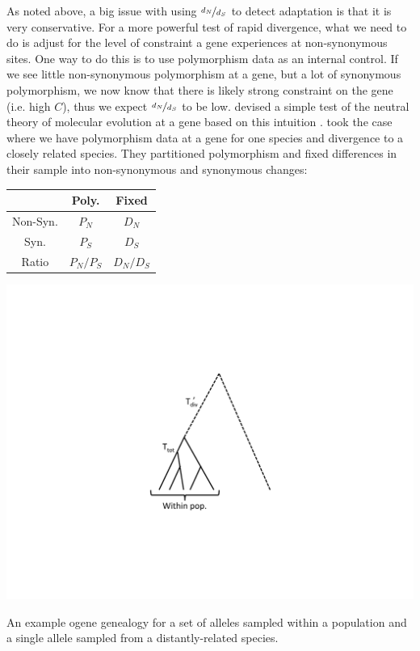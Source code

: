As noted above, a big issue with using $\nicefrac{d_N}{d_S}$ to detect adaptation is that it is very conservative. For a more powerful test of rapid divergence, what we need to do is adjust for the level of constraint a gene experiences at non-synonymous sites. One way to do this is to use polymorphism data as an internal control. If we see little non-synonymous polymorphism at a gene, but a  lot of synonymous polymorphism, we now know that there is likely strong constraint on the gene (i.e. high $C$), thus we expect $\nicefrac{d_N}{d_S}$ to be low. \citet{mcdonald:91} devised a simple test of the neutral theory of molecular evolution at a gene based on this intuition \citep[building on the conceptually similar HKA
test][]{hudson1987test}. \citeauthor{mcdonald:91} took the case where we have polymorphism data at a gene for one species and divergence to a closely related species. They  partitioned polymorphism and fixed differences in their sample into
non-synonymous and synonymous changes:

\begin{center}
\begin{tabular}{ccc}
 & Poly. & Fixed \\
\hline
Non-Syn. &    $P_N$  &   $D_N$  \\
Syn. &    $P_S$   &     $D_S$   \\
Ratio & $P_N/P_S$ & $D_N/D_S$
\end{tabular}
\end{center}

\begin{marginfigure}
\begin{center}
\includegraphics[width= \textwidth]{figures/Coalescent/MK_tree.pdf}
\end{center}
\caption{An example ogene genealogy for a set of alleles sampled within a population and a single allele sampled from a distantly-related species.} \label{fig:MK_tree}
\end{marginfigure}

